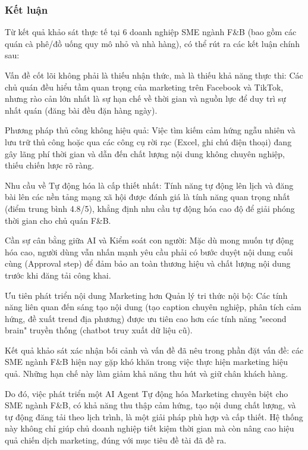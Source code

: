 \subsubsection{Kết luận}\label{kux1ebft-luux1eadn}

Từ kết quả khảo sát thực tế tại 6 doanh nghiệp SME ngành F\&B (bao gồm
các quán cà phê/đồ uống quy mô nhỏ và nhà hàng), có thể rút ra các kết
luận chính sau:

Vấn đề cốt lõi không phải là thiếu nhận thức, mà là thiếu khả năng thực
thi: Các chủ quán đều hiểu tầm quan trọng của marketing trên Facebook và
TikTok, nhưng rào cản lớn nhất là sự hạn chế về thời gian và nguồn lực
để duy trì sự nhất quán (đăng bài đều đặn hàng ngày).

Phương pháp thủ công không hiệu quả: Việc tìm kiếm cảm hứng ngẫu nhiên
và lưu trữ thủ công hoặc qua các công cụ rời rạc (Excel, ghi chú điện
thoại) đang gây lãng phí thời gian và dẫn đến chất lượng nội dung không
chuyên nghiệp, thiếu chiến lược rõ ràng.

Nhu cầu về Tự động hóa là cấp thiết nhất: Tính năng tự động lên lịch và
đăng bài lên các nền tảng mạng xã hội được đánh giá là tính năng quan
trọng nhất (điểm trung bình 4.8/5), khẳng định nhu cầu tự động hóa cao
độ để giải phóng thời gian cho chủ quán F\&B.

Cần sự cân bằng giữa AI và Kiểm soát con người: Mặc dù mong muốn tự động
hóa cao, người dùng vẫn nhấn mạnh yêu cầu phải có bước duyệt nội dung
cuối cùng (Approval step) để đảm bảo an toàn thương hiệu và chất lượng
nội dung trước khi đăng tải công khai.

Ưu tiên phát triển nội dung Marketing hơn Quản lý tri thức nội bộ: Các
tính năng liên quan đến sáng tạo nội dung (tạo caption chuyên nghiệp,
phân tích cảm hứng, đề xuất trend địa phương) được ưu tiên cao hơn các
tính năng "second brain" truyền thống (chatbot truy xuất dữ liệu cũ).

Kết quả khảo sát xác nhận bối cảnh và vấn đề đã nêu trong phần đặt vấn
đề: các SME ngành F\&B hiện nay gặp khó khăn trong việc thực hiện
marketing hiệu quả. Những hạn chế này làm giảm khả năng thu hút và giữ
chân khách hàng.

Do đó, việc phát triển một AI Agent Tự động hóa Marketing chuyên biệt
cho SME ngành F\&B, có khả năng thu thập cảm hứng, tạo nội dung chất
lượng, và tự động đăng tải theo lịch trình, là một giải pháp phù hợp và
cấp thiết. Hệ thống này không chỉ giúp chủ doanh nghiệp tiết kiệm thời
gian mà còn nâng cao hiệu quả chiến dịch marketing, đúng với mục tiêu đề
tài đã đề ra.
